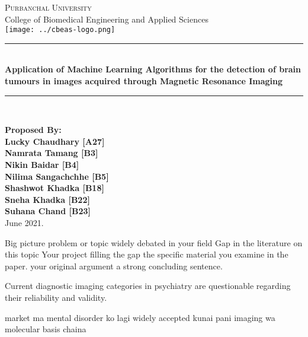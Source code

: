 \documentclass{article}
\newcommand{\HRule}{\rule{\linewidth}{0.1mm}}
\begin{document}
\begin{titlepage}
\begin{center}

  \textsc{\huge Purbanchal University}\\[1cm]
  {\huge College of Biomedical Engineering and Applied Sciences}\\[1cm]
  \texttt{[image: ../cbeas-logo.png]}\\[1cm]

  \color{red} \HRule \\[0.4cm] \color{black}
  {\huge \bfseries Application of Machine Learning Algorithms for the
  detection of brain tumours in images acquired through Magnetic
  Resonance Imaging}\\[0.2cm]
  \color{red} \HRule \\[2cm] \color{black}

\textbf{
\Large Proposed By:\\
\Large Lucky Chaudhary [A27]\\ Namrata Tamang [B3]\\ Nikin Baidar
  [B4]\\ Nilima Sangachchhe [B5]\\ Shashwot Khadka [B18]\\ Sneha
  Khadka [B22]\\Suhana Chand [B23]\\[1cm]}
\vfill
{\Large June 2021.}

\end{center}
\end{titlepage}


  \iffalse
    Big picture problem or topic widely debated in your field
    Gap in the literature on this topic
    Your project filling the gap
    the specific material you examine in the paper.
    your original argument
    a strong concluding sentence.


    Current diagnostic imaging categories in psychiatry are
    questionable regarding their reliability and validity.



    market ma mental disorder ko lagi widely accepted kunai pani
    imaging wa molecular basis chaina
\end{document}
